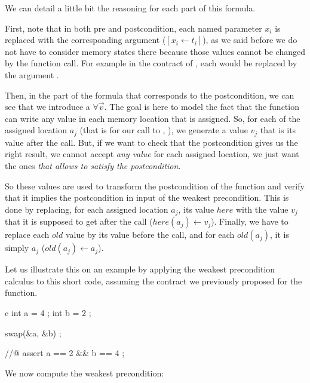 We can detail a little bit the reasoning for each part of this formula.


First, note that in both pre and postcondition, each named parameter $x_i$ is
replaced with the corresponding argument ($[x_i \leftarrow t_i]$), as we said
before we do not have to consider memory states there because those values
cannot be changed by the function call. For example in the contract of
, each  would be replaced by the argument
.



Then, in the part of the formula that corresponds to the postcondition, we can
see that we introduce a $\forall \vec{v}$. The goal is here to model the fact
that the function can write any value in each memory location that is assigned.
So, for each of the assigned location $a_j$ (that is for our call to
, ), we generate a value $v_j$ that is its
value after the call. But, if we want to check that the postcondition gives us
the right result, we cannot accept \emph{any value} for each assigned location,
we just want the ones \emph{that allows to satisfy the postcondition}.



So these values are used to transform the postcondition of the function and
verify that it implies the postcondition in input of the weakest precondition.
This is done by replacing, for each assigned location $a_j$, its value $here$
with the value $v_j$ that it is supposed to get after the call
($here(a_j) \leftarrow v_j$). Finally, we have to replace each $old$ value by
its value before the call, and for each $old(a_j)$, it is simply $a_j$
($old(a_j) \leftarrow a_j$).






Let us illustrate this on an example by applying the weakest precondition
calculus to this short code, assuming the contract we previously proposed for
the  function.



\begin{CodeBlock}{c}
  int a = 4 ;
  int b = 2 ;

  swap(&a, &b) ;

  //@ assert a == 2 && b == 4 ;
\end{CodeBlock}



We now compute the weakest precondition:


